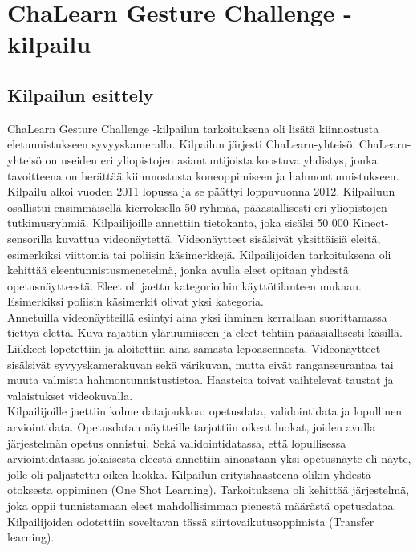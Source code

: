 \section{ChaLearn Gesture Challenge -kilpailu}
\label{ChaLearn Gesture Challenge -kilpailu}

\subsection{Kilpailun esittely}
ChaLearn Gesture Challenge -kilpailun tarkoituksena oli lisätä kiinnostusta eletunnistukseen syvyyskameralla.
Kilpailun järjesti ChaLearn-yhteisö. ChaLearn-yhteisö on useiden eri yliopistojen asiantuntijoista koostuva yhdistys,
jonka tavoitteena on herättää kiinnnostusta koneoppimiseen ja hahmontunnistukseen. \citep{kilpailunnettisivut} Kilpailu alkoi vuoden 2011 lopussa ja se päättyi loppuvuonna 2012. Kilpailuun osallistui ensimmäisellä kierroksella 50 ryhmää,
pääasiallisesti eri yliopistojen tutkimusryhmiä. Kilpailijoille annettiin tietokanta, joka sisälsi 50 000 Kinect-sensorilla kuvattua videonäytettä. 
Videonäytteet sisälsivät yksittäisiä eleitä, esimerkiksi viittomia tai poliisin käsimerkkejä. Kilpailijoiden tarkoituksena oli kehittää eleentunnistusmenetelmä, 
jonka avulla eleet opitaan yhdestä opetusnäytteestä. Eleet oli jaettu kategorioihin käyttötilanteen mukaan. Esimerkiksi poliisin käsimerkit olivat yksi kategoria.
\citep{6239178} \\

Annetuilla videonäytteillä esiintyi aina yksi ihminen kerrallaan suorittamassa tiettyä elettä. Kuva rajattiin yläruumiiseen ja eleet tehtiin
pääasiallisesti käsillä. Liikkeet lopetettiin ja aloitettiin aina samasta lepoasennosta. Videonäytteet sisälsivät syvyyskamerakuvan sekä värikuvan, 
mutta eivät ranganseurantaa tai muuta valmista hahmontunnistustietoa. Haasteita toivat vaihtelevat taustat ja valaistukset videokuvalla.  \citep{6239178}\\

Kilpailijoille jaettiin kolme datajoukkoa: opetusdata, validointidata ja lopullinen arviointidata. 
Opetusdatan näytteille tarjottiin oikeat luokat, joiden avulla järjestelmän opetus onnistui.
Sekä validointidatassa, että lopullisessa arviointidatassa jokaisesta eleestä annettiin ainoastaan yksi opetusnäyte eli näyte,
jolle oli paljastettu oikea luokka. Kilpailun erityishaasteena olikin yhdestä otoksesta oppiminen (One Shot Learning). 
Tarkoituksena oli kehittää järjestelmä, joka oppii tunnistamaan eleet mahdollisimman pienestä määrästä opetusdataa. 
Kilpailijoiden odotettiin soveltavan tässä siirtovaikutusoppimista (Transfer learning). \citep{6239178} \\

